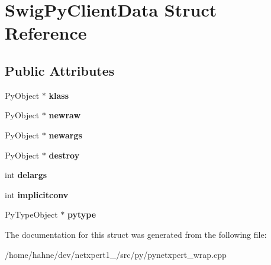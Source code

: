 \hypertarget{structSwigPyClientData}{}\section{Swig\+Py\+Client\+Data Struct Reference}
\label{structSwigPyClientData}
\subsection*{Public Attributes}
\begin{DoxyCompactItemize}
\item 
Py\+Object $\ast$ {\bfseries klass}\hypertarget{structSwigPyClientData_a482d64908147c310a56d1541476079dc}{}\label{structSwigPyClientData_a482d64908147c310a56d1541476079dc}

\item 
Py\+Object $\ast$ {\bfseries newraw}\hypertarget{structSwigPyClientData_a4da9e7723a1319cb42cda4ad186f65a3}{}\label{structSwigPyClientData_a4da9e7723a1319cb42cda4ad186f65a3}

\item 
Py\+Object $\ast$ {\bfseries newargs}\hypertarget{structSwigPyClientData_a8f6dacca2c445f175d622fb9264e3715}{}\label{structSwigPyClientData_a8f6dacca2c445f175d622fb9264e3715}

\item 
Py\+Object $\ast$ {\bfseries destroy}\hypertarget{structSwigPyClientData_a1c4e62712f23db599e85e24e14818d59}{}\label{structSwigPyClientData_a1c4e62712f23db599e85e24e14818d59}

\item 
int {\bfseries delargs}\hypertarget{structSwigPyClientData_a9cb4b9b02743d09dbe216f304e2b7df0}{}\label{structSwigPyClientData_a9cb4b9b02743d09dbe216f304e2b7df0}

\item 
int {\bfseries implicitconv}\hypertarget{structSwigPyClientData_a5f9ebdbc04a774559a64b926b6ec4070}{}\label{structSwigPyClientData_a5f9ebdbc04a774559a64b926b6ec4070}

\item 
Py\+Type\+Object $\ast$ {\bfseries pytype}\hypertarget{structSwigPyClientData_a1f172e51bb27f670dacdf8247843b4c2}{}\label{structSwigPyClientData_a1f172e51bb27f670dacdf8247843b4c2}

\end{DoxyCompactItemize}


The documentation for this struct was generated from the following file\+:\begin{DoxyCompactItemize}
\item 
/home/hahne/dev/netxpert1\+\_/src/py/pynetxpert\+\_\+wrap.\+cpp\end{DoxyCompactItemize}
